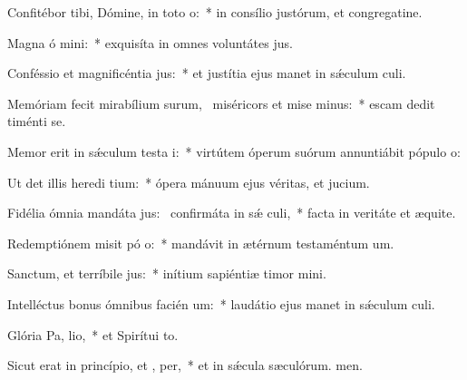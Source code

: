 \item Confitébor tibi, Dómine, in toto  o:~* in consílio justórum, et congregatine.
\item Magna ó mini:~* exquisíta in omnes voluntátes jus.
\item Conféssio et magnificéntia  jus:~* et justítia ejus manet in sǽculum culi.
\item Memóriam fecit mirabílium surum,~\pscross{} miséricors et mise minus:~* escam dedit timénti se.
\item Memor erit in sǽculum testa i:~* virtútem óperum suórum annuntiábit pópulo o:
\item Ut det illis heredi tium:~* ópera mánuum ejus véritas, et jucium.
\item Fidélia ómnia mandáta jus:~\pscross{} confirmáta in sǽ culi,~* facta in veritáte et æquite.
\item Redemptiónem misit pó o:~* mandávit in ætérnum testaméntum um.
\item Sanctum, et terríbile  jus:~* inítium sapiéntiæ timor mini.
\item Intelléctus bonus ómnibus facién um:~* laudátio ejus manet in sǽculum culi.
\item Glória Pa,  lio,~* et Spirítui to.
\item Sicut erat in princípio, et ,  per,~* et in sǽcula sæculórum. men.
